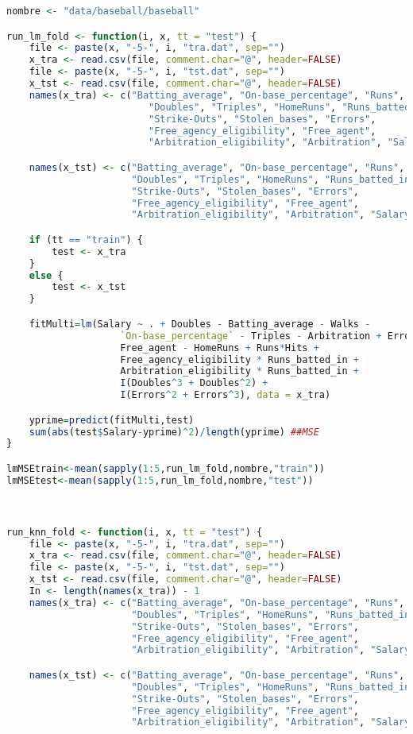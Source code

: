 \begin{lstlisting}[language=R]
nombre <- "data/baseball/baseball"

run_lm_fold <- function(i, x, tt = "test") {
	file <- paste(x, "-5-", i, "tra.dat", sep="")
	x_tra <- read.csv(file, comment.char="@", header=FALSE)
	file <- paste(x, "-5-", i, "tst.dat", sep="")
	x_tst <- read.csv(file, comment.char="@", header=FALSE)
	names(x_tra) <- c("Batting_average", "On-base_percentage", "Runs", "Hits",
						 "Doubles", "Triples", "HomeRuns", "Runs_batted_in", "Walks",
						 "Strike-Outs", "Stolen_bases", "Errors",
						 "Free_agency_eligibility", "Free_agent",
						 "Arbitration_eligibility", "Arbitration", "Salary")

	names(x_tst) <- c("Batting_average", "On-base_percentage", "Runs", "Hits",
					  "Doubles", "Triples", "HomeRuns", "Runs_batted_in", "Walks",
					  "Strike-Outs", "Stolen_bases", "Errors",
					  "Free_agency_eligibility", "Free_agent",
					  "Arbitration_eligibility", "Arbitration", "Salary")

	if (tt == "train") {
		test <- x_tra
	}
	else {
		test <- x_tst
	}

	fitMulti=lm(Salary ~ . + Doubles - Batting_average - Walks -
					`On-base_percentage` - Triples - Arbitration + Errors -
					Free_agent - HomeRuns + Runs*Hits +
					Free_agency_eligibility * Runs_batted_in +
					Arbitration_eligibility * Runs_batted_in +
					I(Doubles^3 + Doubles^2) +
					I(Errors^2 + Errors^3), data = x_tra)

	yprime=predict(fitMulti,test)
	sum(abs(test$Salary-yprime)^2)/length(yprime) ##MSE
}

lmMSEtrain<-mean(sapply(1:5,run_lm_fold,nombre,"train"))
lmMSEtest<-mean(sapply(1:5,run_lm_fold,nombre,"test"))



run_knn_fold <- function(i, x, tt = "test") {
	file <- paste(x, "-5-", i, "tra.dat", sep="")
	x_tra <- read.csv(file, comment.char="@", header=FALSE)
	file <- paste(x, "-5-", i, "tst.dat", sep="")
	x_tst <- read.csv(file, comment.char="@", header=FALSE)
	In <- length(names(x_tra)) - 1
	names(x_tra) <- c("Batting_average", "On-base_percentage", "Runs", "Hits",
					  "Doubles", "Triples", "HomeRuns", "Runs_batted_in", "Walks",
					  "Strike-Outs", "Stolen_bases", "Errors",
					  "Free_agency_eligibility", "Free_agent",
					  "Arbitration_eligibility", "Arbitration", "Salary")

	names(x_tst) <- c("Batting_average", "On-base_percentage", "Runs", "Hits",
					  "Doubles", "Triples", "HomeRuns", "Runs_batted_in", "Walks",
					  "Strike-Outs", "Stolen_bases", "Errors",
					  "Free_agency_eligibility", "Free_agent",
					  "Arbitration_eligibility", "Arbitration", "Salary")


\end{lstlisting}

